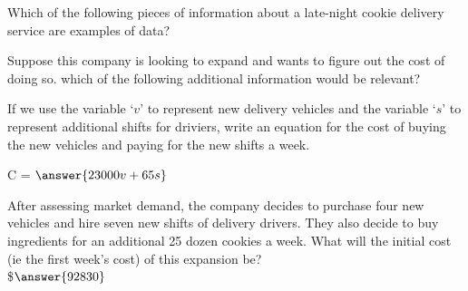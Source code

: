 \documentclass{ximera}
\begin{document}
\begin{problem}
    Which of the following pieces of information about a late-night cookie delivery service are examples of data?
    \begin{selectAll}
    \end{selectAll}

    \begin{problem}
        Suppose this company is looking to expand and wants to figure out the cost of doing so. which of the following additional information would be relevant?
        \begin{selectAll}
        \end{selectAll}

        \begin{problem}
            If we use the variable `$v$' to represent new delivery vehicles and the variable `$s$' to represent additional shifts for driviers, write an equation for the cost of buying the new vehicles and paying for the new shifts a week.

            C = $\answer{23000v + 65s}$

            \begin{problem}
                After assessing market demand, the company decides to purchase four new vehicles and hire seven new shifts of delivery drivers.  They also decide to buy ingredients for an additional 25 dozen cookies a week.  What will the initial cost (ie the first week's cost) of this expansion be?\\
                \$$\answer{92830}$
            \end{problem}
        \end{problem}
    \end{problem}
\end{problem}
\end{document}
